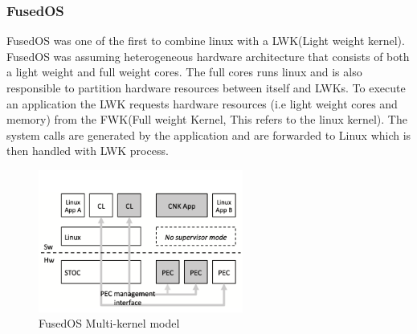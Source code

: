 \subsubsection{FusedOS}
FusedOS\cite{FusedOS} was one of the first to combine 
linux with a LWK(Light weight kernel). FusedOS 
was assuming heterogeneous hardware architecture 
that consists of both a light weight and full 
weight cores. The full cores runs linux and 
is also responsible to partition hardware 
resources between itself and LWKs.
To execute an application the LWK requests 
hardware resources (i.e light weight cores and memory) 
from the FWK(Full weight Kernel, This refers to the 
linux kernel). The system calls are generated 
by the application and are forwarded to Linux 
which is then handled with LWK process. 

\begin{figure}[htbp!] 
  \centering    
  \includegraphics[width=0.6\textwidth]{FigsMultikernel/fusedOSarchitecture}
  \caption[Multi-kernel]{FusedOS Multi-kernel model \cite{FusedOS}}
  \label{fig:FusedOS}
  \end{figure}

